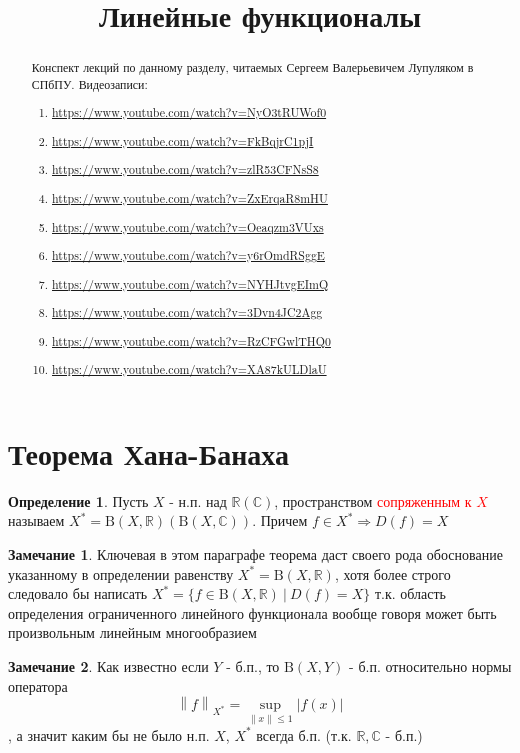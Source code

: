 \documentclass[12pt,a4paper]{article}
\title{Линейные функционалы}
\date{}
\theoremstyle{definition}
\newtheorem{definition}{Определение}[section]
\newtheorem{corollarydf}{Замечание}[definition]
\newcommand{\Real}{\mathbb{R}}
\newcommand{\Cmplx}{\mathbb{C}}
\newcommand{\norm}[1]{\left\lVert#1\right\rVert}
\newcommand{\setbuild}[2]{\{#1\:|\:#2\}}
\newcommand{\bounded}[2]{\textrm{B}(#1, #2)}
\begin{document}
\maketitle

\begin{abstract}
	Конспект лекций по данному разделу, читаемых Сергеем Валерьевичем Лупуляком в СПбПУ. Видеозаписи:
	\begin{enumerate}
		\item \url{https://www.youtube.com/watch?v=NyO3tRUWof0}
		\item \url{https://www.youtube.com/watch?v=FkBqjrC1pjI}
		\item \url{https://www.youtube.com/watch?v=zlR53CFNsS8}
		\item \url{https://www.youtube.com/watch?v=ZxErqaR8mHU}
		\item \url{https://www.youtube.com/watch?v=Oeaqzm3VUxs}
		\item \url{https://www.youtube.com/watch?v=y6rOmdRSggE}
		\item \url{https://www.youtube.com/watch?v=NYHJtvgEImQ}
		\item \url{https://www.youtube.com/watch?v=3Dvn4JC2Agg}
		\item \url{https://www.youtube.com/watch?v=RzCFGwlTHQ0}
		\item \url{https://www.youtube.com/watch?v=XA87kULDlaU}
	\end{enumerate}
	
\end{abstract}

\newpage

\section{Теорема Хана-Банаха}

\begin{definition}
	Пусть $X$ - н.п. над $\Real(\Cmplx)$, пространством \textcolor{red}{сопряженным к $X$} называем $X^*=\bounded{X}{\Real}(\bounded{X}{\Cmplx})$. Причем $f\in X^*\Rightarrow D(f)=X$
\end{definition}
\begin{corollarydf}
	Ключевая в этом параграфе теорема даст своего рода обоснование указанному в определении равенству $X^*=\bounded{X}{\Real}$, хотя более строго следовало бы написать $X^*=\setbuild{f\in \bounded{X}{\Real}}{D(f)=X}$ т.к. область определения ограниченного линейного функционала вообще говоря может быть произвольным линейным многообразием
\end{corollarydf}
\begin{corollarydf}
	Как известно если $Y$ - б.п., то $\bounded{X}{Y}$ - б.п. относительно нормы оператора $$\norm{f}_{X^*}=\sup_{\norm{x}\leq1}|f(x)|$$, а значит каким бы не было н.п. $X$, $X^*$ всегда б.п. (т.к. $\Real,\Cmplx$ - б.п.)
\end{corollarydf}
\end{document}
